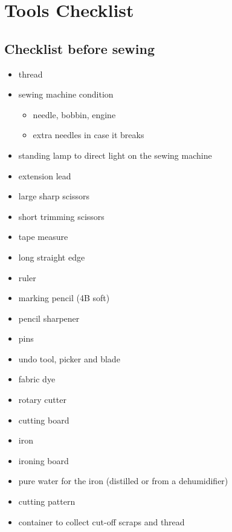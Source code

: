 \chapter{Tools Checklist}


\section{Checklist before sewing}

\begin{itemize}
\tightlist
\item
  thread
\item
  sewing machine condition

  \begin{itemize}
  \tightlist
  \item
    needle, bobbin, engine
  \item
    extra needles in case it breaks
  \end{itemize}
\item
  standing lamp to direct light on the sewing machine
\item
  extension lead
\item
  large sharp scissors
\item
  short trimming scissors
\item
  tape measure
\item
  long straight edge
\item
  ruler
\item
  marking pencil (4B soft)
\item
  pencil sharpener
\item
  pins
\item
  undo tool, picker and blade
\item
  fabric dye
\item
  rotary cutter
\item
  cutting board
\item
  iron
\item
  ironing board
\item
  pure water for the iron (distilled or from a dehumidifier)
\item
  cutting pattern
\item
  container to collect cut-off scraps and thread
\end{itemize}

